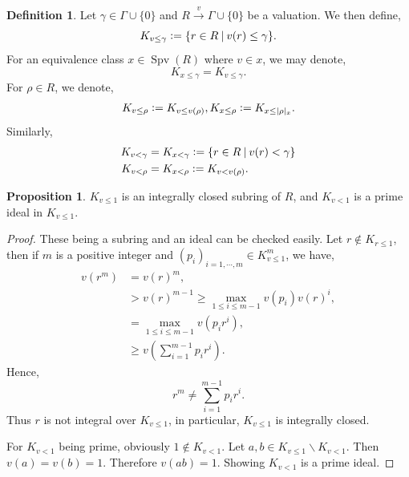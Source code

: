 \documentclass[10pt]{article}
\numberwithin{equation}{section}
\theoremstyle{definition}
\newtheorem{proposition}{Proposition}[subsection]
\newtheorem{definition}{Definition}[subsection]
\DeclareMathOperator{\Spv}{Spv}
\newcommand{\defeq}{\vcentcolon=}
\newcommand{\sep}[0]{\:|\:}
\newcommand{\ab}[1]{\vert #1 \vert}
\begin{document}
\begin{definition}
    \label{definition_6_7}
    Let $\gamma\in\Gamma\cup\{0\}$ and $R\stackrel{v}{\to}\Gamma\cup\{0\}$ be a valuation. We then define,
    \begin{equation*}
    K_{v\leq \gamma}\defeq \{r\in R\sep v(r)\leq \gamma\}.
    \end{equation*}
    For an equivalence class $x\in\Spv(R)$ where $v\in x$, we may denote,
    \begin{equation*}
        K_{x\leq\gamma} = K_{v\leq\gamma}.
    \end{equation*}
    For $\rho\in R$, we denote,
    \begin{align*}
        K_{v\leq\rho} \defeq K_{v\leq v(\rho)}, K_{x\leq \rho} \defeq K_{x\leq\ab{\rho}_x}.
    \end{align*}
    Similarly,
    \begin{align*}
        K_{v<\gamma} &= K_{x<\gamma} \defeq\{r\in R\sep v(r)<\gamma\}\\
        K_{v<\rho} & = K_{x<\rho} \defeq K_{v<v(\rho)}.
    \end{align*}
\end{definition}

\begin{proposition}
    \label{fact_6_5}
    $K_{v\leq 1}$ is an integrally closed subring of $R$, and $K_{v<1}$ is a prime ideal in $K_{v\leq 1}$.
\end{proposition}
\begin{proof}
    These being a subring and an ideal can be checked easily. Let $r\not\in K_{r\leq 1}$, then if $m$ is a positive integer and $(p_i)_{i=1,\cdots,m}\in K_{v\leq 1}^m$, we have,
    \begin{align*}
    v(r^m) &= v(r)^m,\\
    &> v(r)^{m-1}\geq\max_{1\leq i\leq m-1}v(p_i)v(r)^i,\\
    & = \max_{1\leq i\leq m-1}v(p_ir^i),\\
    & \geq v\left(\sum_{i=1}^{m-1}p_ir^i\right).
    \end{align*}
    Hence,
    \begin{equation*}
        r^m \not = \sum_{i=1}^{m-1}p_ir^i.
    \end{equation*}
    Thus $r$ is not integral over $K_{v\leq 1}$, in particular, $K_{v\leq 1}$ is integrally closed.
    \par For $K_{v<1}$ being prime, obviously $1\not\in K_{v<1}$. Let $a,b\in K_{v\leq 1}\backslash K_{v<1}$. Then $v(a) = v(b) = 1$. Therefore $v(ab) = 1$. Showing $K_{v<1}$ is a prime ideal.
\end{proof}
\end{document}
